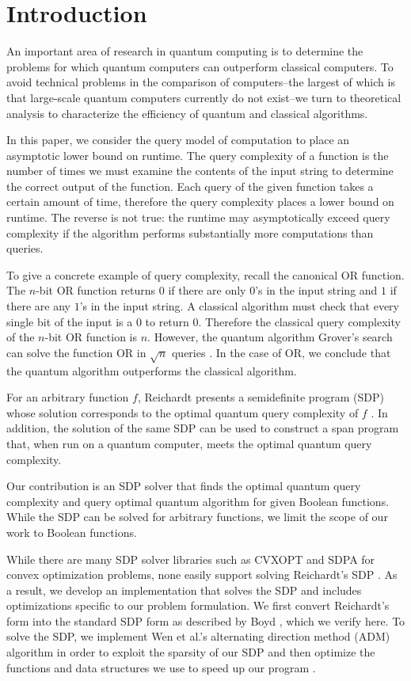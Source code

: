\section{Introduction}

An important area of research in quantum computing is
to determine the problems for which quantum
computers can outperform classical computers.
To avoid technical problems in the comparison of 
computers--the largest
of which is that large-scale quantum computers
currently do not exist--we turn to theoretical
analysis to characterize the efficiency of 
quantum and classical algorithms.

In this paper, we consider the query model of computation
to place an asymptotic lower bound on runtime.
The query complexity of a function 
is the number of times we must examine the
contents of the input string to determine the correct
output of the function. 
Each query of the given function takes a certain
amount of time, therefore the query
complexity places a lower bound on runtime.
The reverse is not true: the runtime
may asymptotically exceed query complexity
if the algorithm performs substantially more
computations than queries.

To give a concrete example of query complexity,
recall the canonical OR function.
The $n$-bit OR
function returns $0$ if there are only $0$'s in the input
string and $1$ if there are any $1$'s in the input string.
A classical algorithm must check that
every single bit of the input is a $0$ to return $0$.
Therefore the classical query complexity of the $n$-bit OR
function is $n$. 
However, the quantum algorithm Grover's
search can solve the function OR in $\sqrt{n}$ queries
\cite{grover1996fast}. In the case of OR, we conclude that
the quantum algorithm outperforms the classical algorithm.

For an arbitrary function $f$,
Reichardt presents a semidefinite program (SDP)
whose solution corresponds to the optimal quantum query complexity
of $f$ \cite{reichardt2009span}.
In addition, the solution of the same SDP can
be used to construct a span program that, when run
on a quantum computer, meets the optimal quantum query complexity.

Our contribution is an SDP solver
that finds the optimal quantum query complexity
and query optimal quantum algorithm for given Boolean functions.
While the SDP can be solved for arbitrary functions,
we limit the scope of our work to Boolean functions.

While there are many SDP solver libraries such as CVXOPT and
SDPA for convex optimization problems,
none easily support solving Reichardt's SDP
\cite{cvxopt, SDPA}.
As a result, we develop an implementation that solves the SDP
and includes optimizations specific to our problem formulation.
We first convert Reichardt's form into the standard SDP form
as described by Boyd \cite{boyd2004convex}, which we verify here.
To solve the SDP, we implement Wen et al.'s alternating direction method (ADM)
algorithm in order to exploit the sparsity of our SDP
and then optimize the functions and data structures we use
to speed up our program \cite{adm}. 

